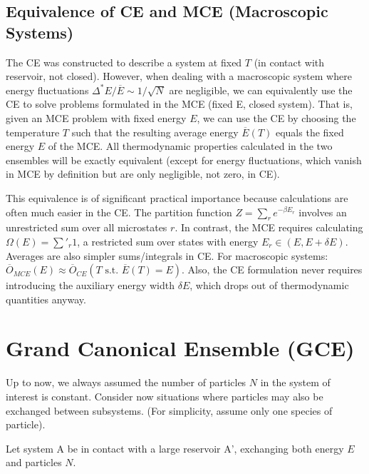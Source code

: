 \documentclass[11pt]{article}
\newcommand{\avg}[1]{\overline{#1}}
\newcommand{\deltaE}{\delta E}
\begin{document}
\subsection*{Equivalence of CE and MCE (Macroscopic Systems)}

The CE was constructed to describe a system at fixed $T$ (in contact with reservoir, not closed). However, when dealing with a macroscopic system where energy fluctuations $\Delta^* E / \avg{E} \sim 1/\sqrt{N}$ are negligible, we can equivalently use the CE to solve problems formulated in the MCE (fixed E, closed system).
That is, given an MCE problem with fixed energy $E$, we can use the CE by choosing the temperature $T$ such that the resulting average energy $\avg{E}(T)$ equals the fixed energy $E$ of the MCE.
All thermodynamic properties calculated in the two ensembles will be exactly equivalent (except for energy fluctuations, which vanish in MCE by definition but are only negligible, not zero, in CE).

This equivalence is of significant practical importance because calculations are often much easier in the CE. The partition function $Z = \sum_r e^{-\beta E_r}$ involves an unrestricted sum over all microstates $r$. In contrast, the MCE requires calculating $\Omega(E) = \sum'_{r} 1$, a restricted sum over states with energy $E_r \in (E, E+\deltaE)$. Averages are also simpler sums/integrals in CE.
For macroscopic systems: $\avg{O}_{MCE}(E) \approx \avg{O}_{CE}(T \text{ s.t. } \avg{E}(T)=E)$.
Also, the CE formulation never requires introducing the auxiliary energy width $\deltaE$, which drops out of thermodynamic quantities anyway.

\section*{Grand Canonical Ensemble (GCE)}

Up to now, we always assumed the number of particles $N$ in the system of interest is constant. Consider now situations where particles may also be exchanged between subsystems. (For simplicity, assume only one species of particle).

Let system A be in contact with a large reservoir A', exchanging both energy $E$ and particles $N$.

\begin{center}
\end{center}
\end{document}
